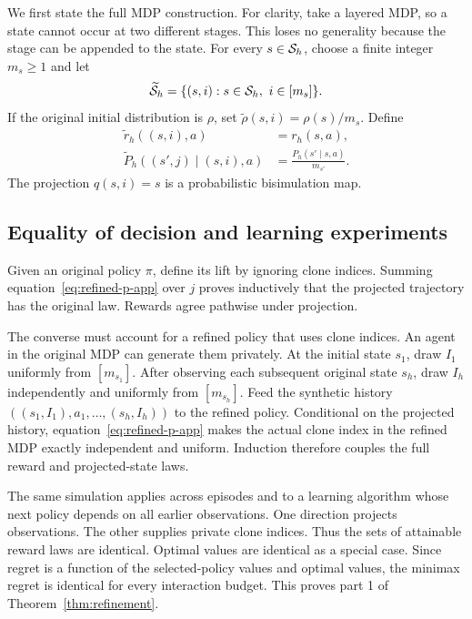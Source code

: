 We first state the full MDP construction. For clarity, take a layered MDP, so a
state cannot occur at two different stages. This loses no generality because the
stage can be appended to the state. For every $s\in\mathcal S_h$, choose a finite integer
$m_s\geq1$ and let
\begin{equation}
 \widetilde\cS_h=\{(s,i):s\in\cS_h,\ i\in[m_s]\}.
\end{equation}
If the original initial distribution is $\rho$, set
$\widetilde\rho(s,i)=\rho(s)/m_s$. Define
\begin{align}
 \widetilde r_h((s,i),a)&=r_h(s,a),
 \label{eq:refined-reward-app}\\
 \widetilde P_h((s',j)\mid(s,i),a)
 &=\frac{P_h(s'\mid s,a)}{m_{s'}}.
 \label{eq:refined-p-app}
\end{align}
The projection $q(s,i)=s$ is a probabilistic bisimulation map.

\subsection{Equality of decision and learning experiments}

Given an original policy $\pi$, define its lift by ignoring clone indices. Summing
equation~\eqref{eq:refined-p-app} over $j$ proves inductively that the projected
trajectory has the original law. Rewards agree pathwise under projection.

The converse must account for a refined policy that uses clone indices. An agent in
the original MDP can generate them privately. At the initial state $s_1$, draw
$I_1$ uniformly from $[m_{s_1}]$. After observing each subsequent original state
$s_h$, draw $I_h$ independently and uniformly from $[m_{s_h}]$. Feed the synthetic
history $((s_1,I_1),a_1,\ldots,(s_h,I_h))$ to the refined policy. Conditional on
the projected history, equation~\eqref{eq:refined-p-app} makes the actual clone
index in the refined MDP exactly independent and uniform. Induction therefore
couples the full reward and projected-state laws.

The same simulation applies across episodes and to a learning algorithm whose next
policy depends on all earlier observations. One direction projects observations.
The other supplies private clone indices. Thus the sets of attainable reward laws
are identical. Optimal values are identical as a special case. Since regret is a
function of the selected-policy values and optimal values, the minimax regret is
identical for every interaction budget. This proves part 1 of
Theorem~\ref{thm:refinement}.

